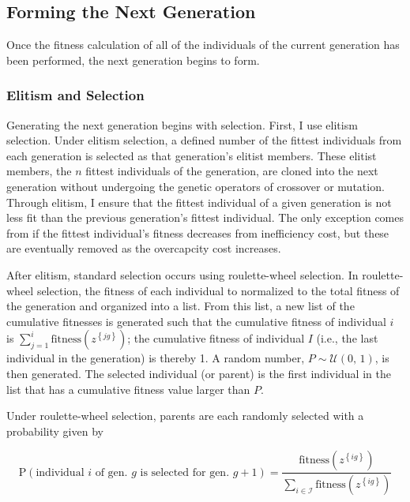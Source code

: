 \documentclass[12pt,dvipsnames]{report}
\begin{document}
\subsection{Forming the Next Generation} \label{subsec:ga_next}

Once the fitness calculation of all of the individuals of the current generation has been performed, the next generation begins to form.

\subsubsection{Elitism and Selection}

Generating the next generation begins with selection.  First, I use elitism selection.  Under elitism selection, a defined number of the fittest individuals from each generation is selected as that generation's elitist members.  These elitist members, the $n$ fittest individuals of the generation, are cloned into the next generation without undergoing the genetic operators of crossover or mutation.  Through elitism, I ensure that the fittest individual of a given generation is not less fit than the previous generation's fittest individual.  The only exception comes from if the fittest individual's fitness decreases from inefficiency cost, but these are eventually removed as the overcapcity cost increases.

After elitism, standard selection occurs using roulette-wheel selection.  In roulette-wheel selection, the fitness of each individual to normalized to the total fitness of the generation and organized into a list.  From this list, a new list of the cumulative fitnesses is generated such that the cumulative fitness of individual $i$ is $\sum_{j = 1}^i \text{fitness} \left( z^{\left\{ jg \right\}} \right)$; the cumulative fitness of individual $I$ (i.e., the last individual in the generation) is thereby 1.  A random number, $P \sim \mathcal{U} \left( 0,\, 1 \right)$, is then generated.  The selected individual (or parent) is the first individual in the list that has a cumulative fitness value larger than $P$.

Under roulette-wheel selection, parents are each randomly selected with a probability given by

\begin{equation}
\text{P}\left( \text{individual $i$ of gen. $g$ is selected for gen. $g+1$} \right) = \frac{\text{fitness}\left( z^{\left\{ ig \right\}} \right)}{\sum_{i \in \mathcal{I}} \text{fitness}\left( z^{\left\{ ig \right\}} \right)}
\end{equation}
\end{document}
